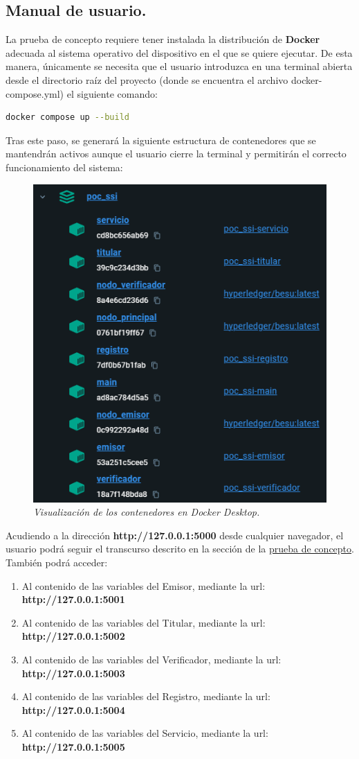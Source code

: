 \documentclass[../main.tex]{subfiles}
\begin{document}
\subsection{Manual de usuario.}\label{Manual de usuario}
La prueba de concepto requiere tener instalada la distribución de \textbf{Docker} adecuada al sistema operativo del dispositivo en el que se quiere ejecutar. De esta manera, únicamente se necesita que el usuario introduzca en una terminal abierta desde el directorio raíz del proyecto (donde se encuentra el archivo docker-compose.yml) el siguiente comando:

\begin{lstlisting}[language=sh]
  docker compose up --build
\end{lstlisting}

\noindent Tras este paso, se generará la siguiente estructura de contenedores que se mantendrán activos aunque el usuario cierre la terminal y permitirán el correcto funcionamiento del sistema:

\begin{figure}[htbp]
    \centering
    \includegraphics[width=0.57\linewidth]{images/design/contenedores.png}
    \caption{\textit{Visualización de los contenedores en Docker Desktop.}}
\end{figure}

\noindent Acudiendo a la dirección \textbf{http://127.0.0.1:5000} desde cualquier navegador, el usuario podrá seguir el transcurso descrito en la sección de la \hyperref[Prueba de concepto]{prueba de concepto}. También podrá acceder:

\begin{enumerate}
    \item Al contenido de las variables del Emisor, mediante la url: \quad  \textbf{http://127.0.0.1:5001}
    \item Al contenido de las variables del Titular, mediante la url: \quad \textbf{http://127.0.0.1:5002}
    \item Al contenido de las variables del Verificador, mediante la url: \quad \textbf{http://127.0.0.1:5003}
    \item Al contenido de las variables del Registro, mediante la url: \quad \textbf{http://127.0.0.1:5004}
    \item Al contenido de las variables del Servicio, mediante la url: \quad \textbf{http://127.0.0.1:5005}
\end{enumerate}
\end{document}
